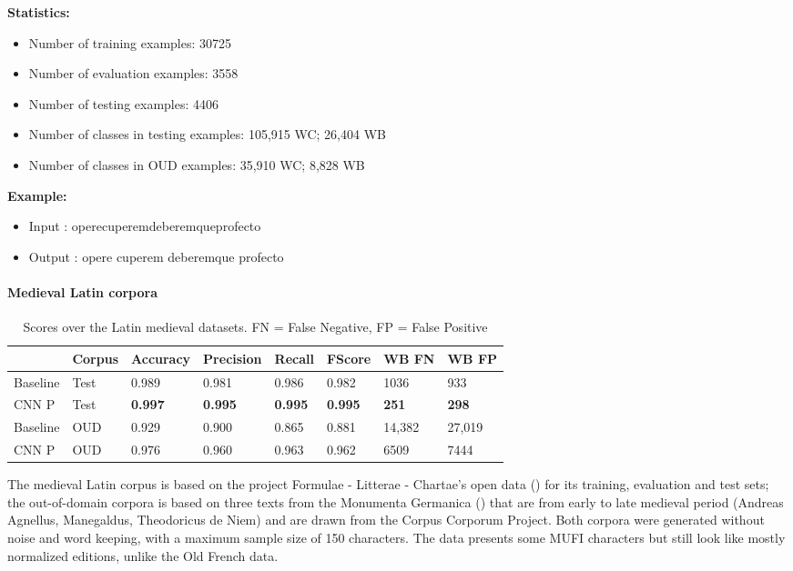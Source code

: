 \documentclass{jdmdh}
\begin{document}
\textbf{Statistics:}
\begin{itemize}
\item Number of training examples: 30725
\item Number of evaluation examples: 3558
\item Number of testing examples: 4406
\item Number of classes in testing examples: 105,915 WC; 26,404 WB
\item Number of classes in OUD examples: 35,910 WC; 8,828 WB
\end{itemize}

\textbf{Example:}

\begin{itemize}
    \item Input : operecuperemdeberemqueprofecto
    \item Output : opere cuperem deberemque profecto

\end{itemize}

\paragraph{Medieval Latin corpora}

\begin{table}[H]
\centering
\begin{tabular}{llllllll}
\hline
 & Corpus & Accuracy & Precision & Recall & FScore & WB FN & WB FP \\ \hline
Baseline & Test & 0.989 & 0.981 & 0.986 & 0.982 & 1036 & 933 \\
CNN P & Test & \textbf{0.997} & \textbf{0.995} & \textbf{0.995} & \textbf{0.995} & \textbf{251} & \textbf{298} \\ \hline
Baseline & OUD & 0.929 & 0.900 & 0.865 & 0.881 & 14,382 & 27,019 \\
CNN P & OUD & 0.976 & 0.960 & 0.963 & 0.962 & 6509 & 7444\\ \hline
\end{tabular}
\caption{Scores over the Latin medieval datasets. FN = False Negative, FP = False Positive}
\label{tab:medieval_latin_corpora}
\end{table}


The medieval Latin corpus is based on the project Formulae - Litterae - Chartae's open data (\citet{formulae}) for its training, evaluation and test sets; the out-of-domain corpora is based on three texts from the Monumenta Germanica (\citet{germanica}) that are from early to late medieval period (Andreas Agnellus, Manegaldus, Theodoricus de Niem) and are drawn from the Corpus Corporum Project. Both corpora were generated without noise and word keeping, with a maximum sample size of 150 characters. The data presents some MUFI characters but still look like mostly normalized editions, unlike the Old French data.
\end{document}
